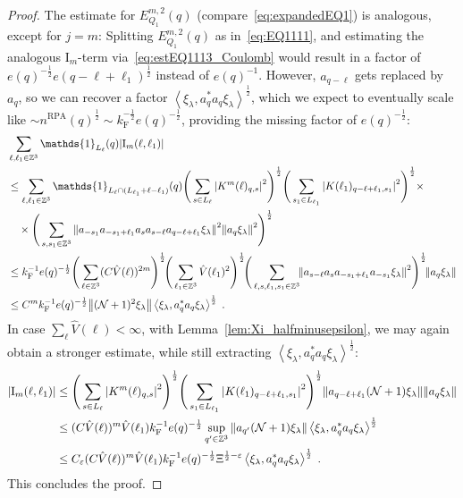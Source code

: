 \documentclass[12pt,a4paper]{article}
\numberwithin{equation}{section}
\newcommand{\1}{\mathbb{I}}
\newcommand{\F}{\mathrm{F}}
\newcommand{\I}{\mathrm{I}}
\newcommand{\RPA}{\mathrm{RPA}}
\newcommand{\kF}{k_\F}
\newcommand{\Zstar}{\mathbb{Z}^3} %
\newcommand{\Z}{\mathbb{Z}}
\newcommand{\NN}{\mathcal{N}}
\newcommand{\half}{\frac{1}{2}}
\newcommand{\eva}[1]{\left\langle #1 \right\rangle}
\theoremstyle{plain}
\theoremstyle{definition}
\theoremstyle{remark}
\theoremstyle{plain}
\theoremstyle{definition}
\theoremstyle{remark}
\begin{document}
\begin{proof}
The estimate for $ E^{m,2}_{Q_1}(q) $ (compare~\eqref{eq:expandedEQ1}) is analogous, except for $ j = m $: Splitting $ E^{m,2}_{Q_1}(q) $ as in~\eqref{eq:EQ1111}, and estimating the analogous $ \I_m $-term via~\eqref{eq:estEQ1113_Coulomb} would result in a factor of $ e(q)^{-\half} e(q-\ell+\ell_1)^{\half} $ instead of $ e(q)^{-1} $. However, $ a_{q-\ell} $ gets replaced by $ a_q $, so we can recover a factor $ \eva{\xi_\lambda, a_q^* a_q \xi_\lambda}^{\half} $, which we expect to eventually scale like $ \sim n^{\RPA}(q)^{\half} \sim \kF^{-\half} e(q)^{-\half} $, providing the missing factor of $ e(q)^{-\half} $:
\begin{align}
		&\sum_{\ell,\ell_1 \in \Zstar} \mathds{1}_{L_\ell}(q) |\I_m(\ell, \ell_1)| \nonumber\\
		&\leq \sum_{\ell,\ell_1 \in \Zstar} \mathds{1}_{L_\ell \cap (L_{\ell_1}+\ell-\ell_1) }(q)
		\Bigg(\sum\limits_{s \in L_{\ell}} \abs{K^m(\ell)_{q,s}}^2\Bigg)^\half
		\Bigg(\sum\limits_{s_1 \in L_{\ell_1}} \abs{K(\ell_1)_{q-\ell+\ell_1,s_1}}^2\Bigg)^\half \times \nonumber\\
		&\quad \times \Bigg( \sum_{s,s_1 \in \Z^3} \norm{ a_{-s_1} a_{-s_1+\ell_1} a_s a_{s-\ell} a_{q-\ell+\ell_1} \xi_\lambda}^2
		\norm{ a_q \xi_\lambda }^2 \Bigg)^{\half} \nonumber\\
		&\leq \kF^{-1} e(q)^{-\frac 12}
		\Bigg(\sum_{\ell \in \Zstar} (C \hat{V}(\ell))^{2m} \Bigg)^\half \!
		\Bigg(\sum_{\ell_1 \in \Zstar} \hat{V}(\ell_1)^2 \Bigg)^\half \!
		\Bigg( \sum_{\ell, s, \ell_1, s_1 \in \Z^3}  \!\!\norm{ a_{s-\ell} a_s a_{-s_1+\ell_1} a_{-s_1} \xi_\lambda}^2\Bigg)^{\half} \!
		\norm{ a_q \xi_\lambda }  \nonumber\\
		&\leq C^m \kF^{-1} e(q)^{-\frac 12}
			\norm{ (\NN+1)^2 \xi_\lambda }
			\eva{\xi_{\lambda},a_q^* a_q\xi_{\lambda}}^{\half} \;. \label{eq:estEQ1113_Coulomb_bis}
\end{align}
In case $ \sum_\ell \hat{V}(\ell) < \infty $, with Lemma~\ref{lem:Xi_halfminusepsilon}, we may again obtain a stronger estimate, while still extracting $ \eva{\xi_\lambda, a_q^* a_q \xi_\lambda}^{\half} $:
\begin{align}
		|\I_m(\ell, \ell_1)|
		&\leq \Bigg(\sum\limits_{s \in L_{\ell}} \abs{K^m(\ell)_{q,s}}^2\Bigg)^\half
		\Bigg(\sum\limits_{s_1 \in L_{\ell_1}} \abs{K(\ell_1)_{q-\ell+\ell_1,s_1}}^2\Bigg)^\half
		\norm{ a_{q-\ell+\ell_1} (\NN+1) \xi_\lambda}
		\norm{ a_q \xi_\lambda }\nonumber\\
		&\leq (C \hat{V}(\ell))^m \hat{V}(\ell_1) \kF^{-1} e(q)^{-\half}
		\sup_{q' \in \Z^3} \norm{ a_{q'} (\NN+1) \xi_\lambda }
		\eva{\xi_{\lambda},a_q^* a_q\xi_{\lambda}}^{\half} \nonumber\\
		&\leq C_\varepsilon (C \hat{V}(\ell))^m
		\hat{V}(\ell_1)
		\kF^{-1} e(q)^{-\half} \Xi^{\half-\varepsilon} \eva{\xi_{\lambda},a_q^* a_q\xi_{\lambda}}^{\half} \;.  		\label{eq:estEQ1113_bis}
\end{align}
This concludes the proof.
\end{proof}
\end{document}

